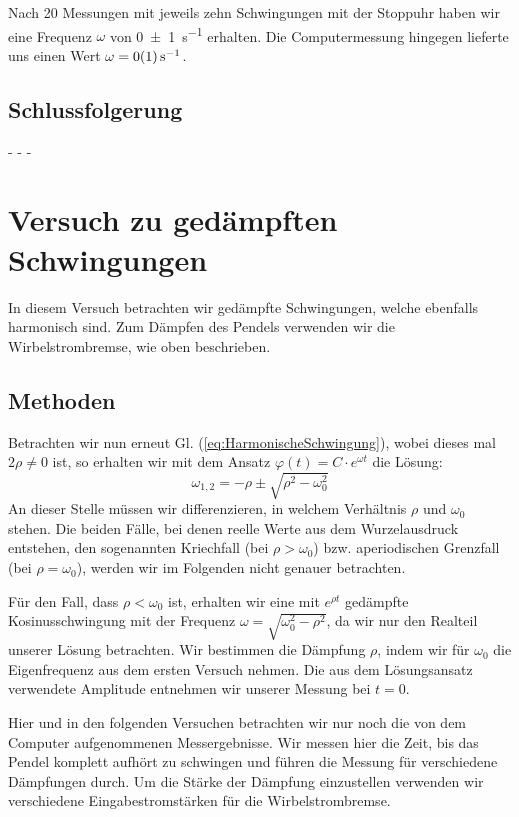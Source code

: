 \documentclass[11pt,a4paper,titlepage, ngerman]{article}
\newcommand{\refeq}[1]{Gl. (\ref{eq:#1})}
\begin{document}
			Nach 20 Messungen mit jeweils zehn Schwingungen mit der Stoppuhr haben wir eine Frequenz $\omega$ von \SI{0 +- 1}{\s^{-1}} erhalten. Die Computermessung hingegen lieferte uns einen Wert $\omega = \SI{0 +- 1}{\s^{-1}}$.  
			
		\subsection*{Schlussfolgerung}
			
			- - -
				
	\section{Versuch zu gedämpften Schwingungen}
		
		In diesem Versuch betrachten wir gedämpfte Schwingungen, welche ebenfalls harmonisch sind.
		Zum Dämpfen des Pendels verwenden wir die Wirbelstrombremse, wie oben beschrieben. 
				
		\subsection*{Methoden}
			
			Betrachten wir nun erneut \refeq{HarmonischeSchwingung}, wobei dieses mal $2\rho \neq 0$ ist, so
			erhalten wir mit dem Ansatz $\varphi (t)=C\cdot e^{\omega t}$ die Lösung: 
			\begin{equation}
				\omega_{1,2}= -\rho \pm \sqrt{\rho^2-\omega_0^2} \label{eq:HarmonischeFrequenz}
			\end{equation}
			An dieser Stelle müssen wir differenzieren, in welchem Verhältnis $\rho$ und $\omega_0$ stehen.
			Die beiden Fälle, bei denen reelle Werte aus dem Wurzelausdruck entstehen, den sogenannten Kriechfall (bei $\rho > \omega_0$) bzw. aperiodischen Grenzfall (bei $\rho = \omega_0 $), werden wir im Folgenden nicht genauer betrachten. 
			
			Für den Fall, dass $\rho < \omega_0 $ ist, erhalten wir eine mit $e^{\rho t}$ gedämpfte Kosinusschwingung mit der Frequenz $\omega = \sqrt{\omega_0^2-\rho^2}$, da wir nur den Realteil unserer Lösung betrachten. Wir bestimmen die Dämpfung $\rho$, indem wir für $\omega_0$ die Eigenfrequenz aus dem ersten Versuch nehmen. Die aus dem Lösungsansatz verwendete Amplitude entnehmen wir unserer Messung bei $t=0$.
						
			Hier und in den folgenden Versuchen betrachten wir nur noch die von dem Computer aufgenommenen Messergebnisse. Wir messen hier die Zeit, bis das Pendel komplett aufhört zu schwingen und führen die Messung für verschiedene Dämpfungen durch. Um die Stärke der Dämpfung einzustellen verwenden wir verschiedene Eingabestromstärken für die Wirbelstrombremse.
		
\end{document}
